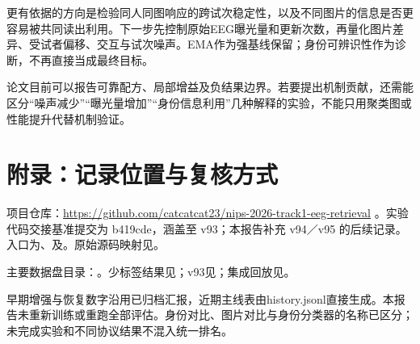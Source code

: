 \documentclass[UTF8,a4paper,11pt,fontset=none]{ctexart}
\begin{document}
更有依据的方向是检验同人同图响应的跨试次稳定性，以及不同图片的信息是否更容易被共同读出利用。下一步先控制原始EEG曝光量和更新次数，再量化图片差异、受试者偏移、交互与试次噪声。EMA作为强基线保留；身份可辨识性作为诊断，不再直接当成最终目标。

论文目前可以报告可靠配方、局部增益及负结果边界。若要提出机制贡献，还需能区分“噪声减少”“曝光量增加”“身份信息利用”几种解释的实验，不能只用聚类图或性能提升代替机制验证。

\section{附录：记录位置与复核方式}
项目仓库：\url{https://github.com/catcatcat23/nips-2026-track1-eeg-retrieval} 。实验代码交接基准提交为 b419cde，涵盖至 v93；本报告补充 v94／v95 的后续记录。入口为、及。原始源码映射见。

主要数据盘目录：。少标签结果见；v93见；集成回放见。

早期增强与恢复数字沿用已归档汇报，近期主线表由history.jsonl直接生成。本报告未重新训练或重跑全部评估。身份对比、图片对比与身份分类器的名称已区分；未完成实验和不同协议结果不混入统一排名。
\end{document}
